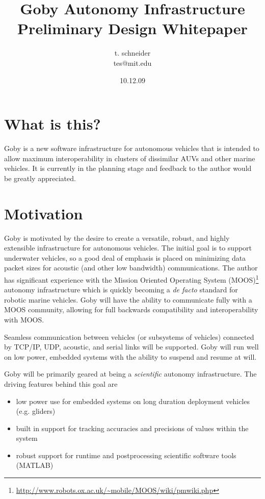 \documentclass[10pt,letterpaper]{article}
\author{t. schneider \\ tes@mit.edu}
\title{Goby Autonomy Infrastructure Preliminary Design Whitepaper}
\date{10.12.09}
\begin{document}
\maketitle 

\section{What is this?}
Goby is a new software infrastructure for autonomous vehicles that is intended to allow maximum interoperability in clusters of dissimilar AUVs and other marine vehicles. It is currently in the planning stage and feedback to the author would be greatly appreciated.

\section{Motivation}

Goby is motivated by the desire to create a versatile, robust, and highly extensible infrastructure for autonomous vehicles. The initial goal is to support underwater vehicles, so a good deal of emphasis is placed on minimizing data packet sizes for acoustic (and other low bandwidth) communications. The author has significant experience with the Mission Oriented Operating System (MOOS)\footnote{\url{http://www.robots.ox.ac.uk/~mobile/MOOS/wiki/pmwiki.php}} autonomy infrastructure which is quickly becoming a \textit{de facto} standard for robotic marine vehicles. Goby will have the ability to communicate fully with a MOOS community, allowing for full backwards compatibility and interoperability with MOOS.

Seamless communication between vehicles (or subsystems of vehicles) connected by TCP/IP, UDP, acoustic, and serial links will be supported. Goby will run well on low power, embedded systems with the ability to suspend and resume at will.

Goby will be primarily geared at being a \textit{scientific} autonomy infrastructure. The driving features behind this goal are

\begin{itemize}
\item low power use for embedded systems on long duration deployment vehicles (e.g. gliders)
\item built in support for tracking accuracies and precisions of values within the system
\item robust support for runtime and postprocessing scientific software tools (MATLAB)
\end{itemize}
\end{document}
